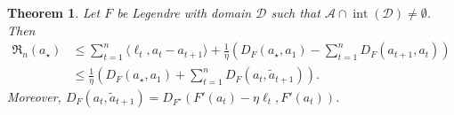 \documentclass{article}
\theoremstyle{plain}
\newtheorem{theorem}{Theorem}
\theoremstyle{definition}
\newcommand{\Reg}{\mathfrak{R}}
\newcommand{\cA}{\mathcal A}
\newcommand{\cD}{\mathcal D}
\newcommand{\interior}{\operatorname{int}}
\begin{document}
\begin{theorem}\label{thm:MD}
    Let $F$ be Legendre with domain $\cD$ such that $\cA \cap \interior(\cD)\neq \emptyset$.
    Then
    \begin{align*}
        \Reg_n(a_\star)
         & \leq
        \sum_{t=1}^{n} \langle \ell_t, a_t - a_{t+1} \rangle
        + \frac{1}{\eta}
        \left(
        D_F(a_\star, a_1) -
        \sum_{t=1}^{n} D_F(a_{t+1}, a_t)
        \right) \\
         & \leq
        \frac{1}{\eta}
        \left(
        D_F(a_\star, a_1) + \sum_{t=1}^{n} D_F(a_{t}, \tilde{a}_{t+1})
        \right).
    \end{align*}
    Moreover,
    $ D_F(a_{t}, \tilde{a}_{t+1})
        = D_{F^\star}\left(F'(a_t) - \eta \ell_t, F'(a_t)\right)$.
\end{theorem}
\end{document}
